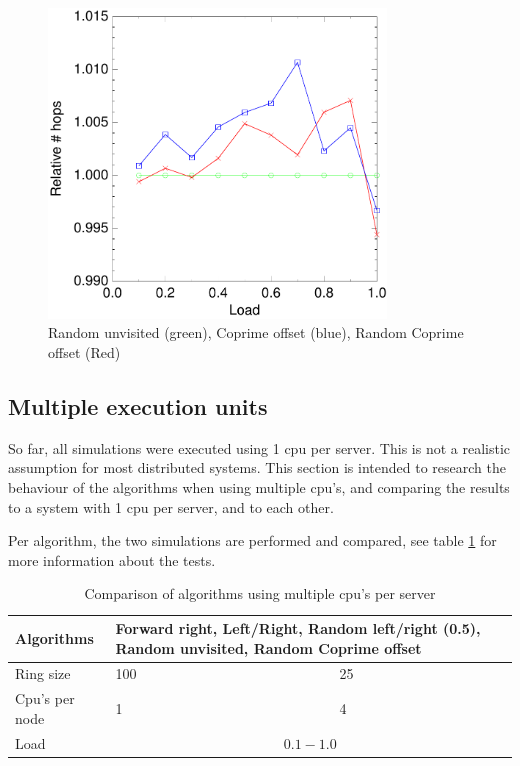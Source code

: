 \documentclass[10pt,a4paper]{article}
\begin{document}
\begin{figure}[h!tb]
\centering
\includegraphics[width=0.8\textwidth]{data/randunvisited_prime_randprime.pdf}
\caption{Random unvisited (green), Coprime offset (blue), Random Coprime offset (Red)}
\label{figrandunvisited}
\end{figure}

\subsection{Multiple execution units}
So far, all simulations were executed using 1 cpu per server. This is not a realistic assumption for most distributed systems. This section is intended to research the behaviour of the algorithms when using multiple cpu's, and comparing the results to a system with 1 cpu per server, and to each other.

Per algorithm, the two simulations are performed and compared, see table \ref{tabcpus} for more information about the tests.
\begin{table}[h!]
\centering
\begin{tabular}{|p{}|p{}|p{}|} \hline
Algorithms & \multicolumn{2}{|p{0.8\textwidth}|}{Forward right, Left/Right, Random left/right (0.5), Random unvisited, Random Coprime offset} \\ \hline
Ring size & 100 & 25 \\ \hline
Cpu's per node	& 1 & 4 \\ \hline
Load	& \multicolumn{2}{|c|}{$0.1 - 1.0$} \\ \hline
\end{tabular}
\caption{Comparison of algorithms using multiple cpu's per server}
\label{tabcpus}
\end{table}
\end{document}
